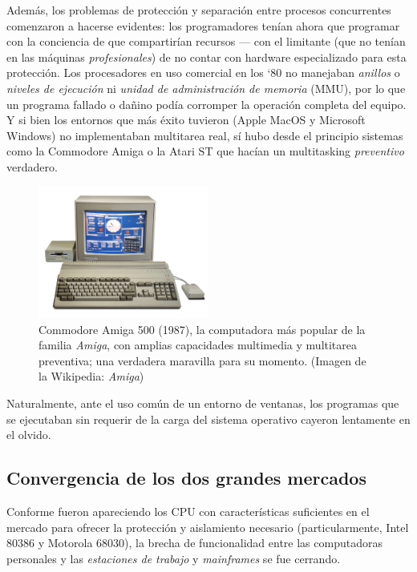 \documentclass[11pt,fleqn]{book} %
\begin{document}
Además, los problemas de protección y separación entre procesos
concurrentes comenzaron a hacerse evidentes: los programadores tenían
ahora que programar con la conciencia de que compartirían recursos —
con el limitante (que no tenían en las máquinas \emph{profesionales}) de no
contar con hardware especializado para esta protección. Los
procesadores en uso comercial en los `80 no manejaban \emph{anillos} o
\emph{niveles de ejecución} ni \emph{unidad de administración de memoria} (MMU),
por lo que un programa fallado o dañino podía corromper la operación
completa del equipo. Y si bien los entornos que más éxito tuvieron
(Apple MacOS y Microsoft Windows) no implementaban multitarea real, sí
hubo desde el principio sistemas como la Commodore Amiga o la Atari ST
que hacían un multitasking \emph{preventivo} verdadero.

\begin{figure}[htb]
\centering
\includegraphics[width=0.5\textwidth]{./img/A500.jpg}
\caption{\label{INTRO_A1000}Commodore Amiga 500 (1987), la computadora más popular de la familia \emph{Amiga}, con amplias capacidades multimedia y multitarea preventiva; una verdadera maravilla para su momento. (Imagen de la Wikipedia: \emph{Amiga})}
\end{figure}

Naturalmente, ante el uso común de un entorno de ventanas, los
programas que se ejecutaban sin requerir de la carga del sistema
operativo cayeron lentamente en el olvido.
\subsection{Convergencia de los dos grandes mercados}
\label{sec-1-4-5}


Conforme fueron apareciendo los CPU con características suficientes
en el mercado para ofrecer la protección y aislamiento necesario
(particularmente, Intel 80386 y Motorola 68030), la brecha de
funcionalidad entre las computadoras personales y las \emph{estaciones de trabajo} y \emph{mainframes} se fue cerrando.
\end{document}
